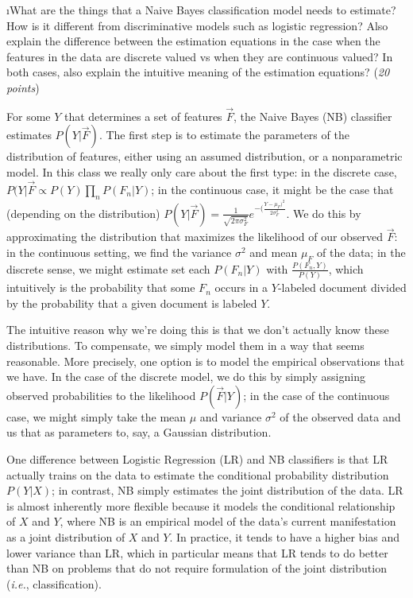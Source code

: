 \documentclass[fleqn]{article}
\begin{document}
\i What are the things that a Naive Bayes classification model needs to estimate?
How is it different from discriminative models such as logistic regression? Also
explain the difference between the estimation equations in the case when the
features in the data are discrete valued vs when they are continuous valued? In 
both cases, also explain the intuitive meaning of the estimation equations? 
(\emph{20 points})

\begin{solution}
For some $Y$ that determines a set of features $\vec{F}$, the Naive Bayes (NB) classifier estimates $P(Y | \vec{F})$. The first step is to estimate the parameters of the distribution of features, either using an assumed distribution, or a nonparametric model. In this class we really only care about the first type: in the discrete case, $P(Y | \vec{F} \propto P(Y) \prod_n P(F_n | Y)$; in the continuous case, it might be the case that (depending on the distribution) $P(Y | \vec{F}) = \frac{1}{\sqrt{2 \pi \sigma_F^2}} e^{-(\frac{Y-\mu_F)^2}{2 \sigma_F^2}}$. We do this by approximating the distribution that maximizes the likelihood of our observed $\vec{F}$: in the continuous setting, we find the variance $\sigma^2$ and mean $\mu_F$ of the data; in the discrete sense, we might estimate set each $P(F_n | Y)$ with $\frac{P(F_n, Y)}{P(Y)}$, which intuitively is the probability that some $F_n$ occurs in a $Y$-labeled document divided by the probability that a given document is labeled $Y$. \linebreak

The intuitive reason why we're doing this is that we don't actually know these distributions. To compensate, we simply model them in a way that seems reasonable. More precisely, one option is to model the empirical observations that we have. In the case of the discrete model, we do this by simply assigning observed probabilities to the likelihood $P(\vec{F} | Y)$; in the case of the continuous case, we might simply take the mean $\mu$ and variance $\sigma^2$ of the observed data and us that as parameters to, say, a Gaussian distribution. \linebreak

One difference between Logistic Regression (LR) and NB classifiers is that LR actually trains on the data to estimate the conditional probability distribution $P(Y|X)$; in contrast, NB simply estimates the joint distribution of the data. LR is almost inherently more flexible because it models the conditional relationship of $X$ and $Y$, where NB is an empirical model of the data's current manifestation as a joint distribution of $X$ and $Y$. In practice, it tends to have a higher bias and lower variance than LR, which in particular means that LR tends to do better than NB on problems that do not require formulation of the joint distribution (\textit{i.e.}, classification).
\end{solution}
\end{document}
